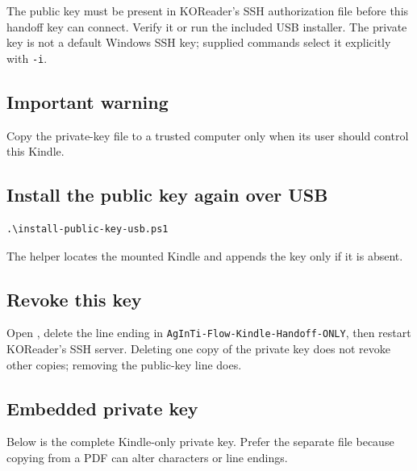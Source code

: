 \documentclass[10pt,letterpaper]{article}
\begin{document}
The public key must be present in KOReader's SSH authorization file before this handoff key can connect. Verify it or run the included USB installer. The private key is not a default Windows SSH key; supplied commands select it explicitly with \texttt{-i}.

\subsection{Important warning}

\begin{center}
\end{center}

Copy the private-key file to a trusted computer only when its user should control this Kindle.

\subsection{Install the public key again over USB}

\begin{Verbatim}[fontsize=\small]
.\install-public-key-usb.ps1
\end{Verbatim}

The helper locates the mounted Kindle and appends the key only if it is absent.

\subsection{Revoke this key}

Open , delete the line ending in \texttt{AgInTi-Flow-Kindle-Handoff-ONLY}, then restart KOReader's SSH server. Deleting one copy of the private key does not revoke other copies; removing the public-key line does.

\subsection{Embedded private key}

Below is the complete Kindle-only private key. Prefer the separate file because copying from a PDF can alter characters or line endings.
\end{document}
